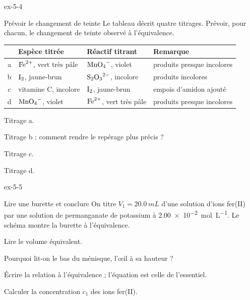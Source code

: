 \begin{blocLivre}{ex-5-4}
\begin{exercice}[1]{Prévoir le changement de teinte}
Le tableau décrit quatre titrages. Prévoir, pour chacun, le changement de teinte observé à l'équivalence.
\par\smallskip\noindent\hfill\begin{tabular}{clll}
\toprule
 & Espèce titrée & Réactif titrant & Remarque \\
\midrule
a & $\ce{Fe^{2+}}$, vert très pâle & $\ce{MnO4-}$, violet & produits presque incolores \\
b & $\ce{I2}$, jaune-brun & $\ce{S2O3^{2-}}$, incolore & produits incolores \\
c & vitamine C, incolore & $\ce{I2}$, jaune-brun & empois d'amidon ajouté \\
d & $\ce{MnO4-}$, violet & $\ce{Fe^{2+}}$, vert très pâle & produits presque incolores \\
\bottomrule
\end{tabular}\hfill\null\par\smallskip
\begin{questions}
\item Titrage a.
\item Titrage b ; comment rendre le repérage plus précis ?
\item Titrage c.
\item Titrage d.
\end{questions}
\end{exercice}
\end{blocLivre}
\begin{blocLivre}{ex-5-5}
\begin{exercice}[1]{Lire une burette et conclure}
On titre $V_1=\qty{20,0}{mL}$ d'une solution d'ions fer(II) par une solution de permanganate de potassium à \qty{2,00e-2}{mol.L^{-1}}.
Le schéma montre la burette à l'équivalence.
\begin{questions}
\item Lire le volume équivalent.
\item Pourquoi lit-on le bas du ménisque, l'œil à sa hauteur ?
\item Écrire la relation à l'équivalence ; l'équation est celle de l'essentiel.
\item Calculer la concentration $c_1$ des ions fer(II).
\end{questions}
\end{exercice}
\end{blocLivre}
